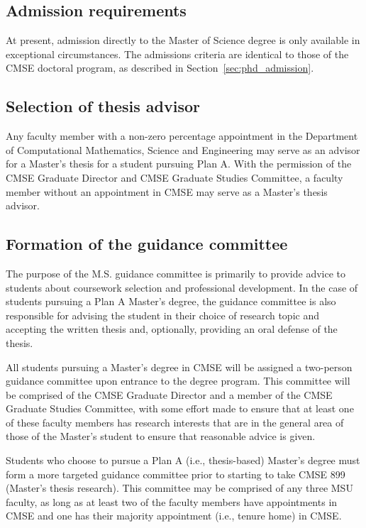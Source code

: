 \subsection{Admission requirements}

At present, admission directly to the Master of Science degree is only
available in exceptional circumstances.  The admissions criteria are
identical to those of the CMSE doctoral program, as described in
Section~\ref{sec:phd_admission}.

\subsection{Selection of thesis advisor}

Any faculty member with a non-zero percentage appointment in the
Department of Computational Mathematics, Science and Engineering may
serve as an advisor for a Master's thesis for a student pursuing Plan
A.  With the permission of the CMSE Graduate Director and CMSE
Graduate Studies Committee, a faculty member without an appointment in
CMSE may serve as a Master's thesis advisor.

\subsection{Formation of the guidance committee}
\label{sec:ms_guidance_comm}

The purpose of the M.S. guidance committee is primarily to provide
advice to students about coursework selection and professional
development.  In the case of students pursuing a Plan A Master's
degree, the guidance committee is also responsible for advising the
student in their choice of research topic and accepting the written
thesis and, optionally, providing an oral defense of the thesis.

All students pursuing a Master's degree in CMSE will be assigned a
two-person guidance committee upon entrance to the degree program.
This committee will be comprised of the CMSE Graduate Director and a
member of the CMSE Graduate Studies Committee, with some effort made
to ensure that at least one of these faculty members has research
interests that are in the general area of those of the Master's
student to ensure that reasonable advice is given.

Students who choose to pursue a Plan A (i.e., thesis-based) Master's
degree must form a more targeted guidance committee prior to starting
to take CMSE 899 (Master's thesis research).  This committee may be
comprised of any three MSU faculty, as long as at least two of the
faculty members have appointments in CMSE and one has their majority
appointment (i.e., tenure home) in CMSE.

